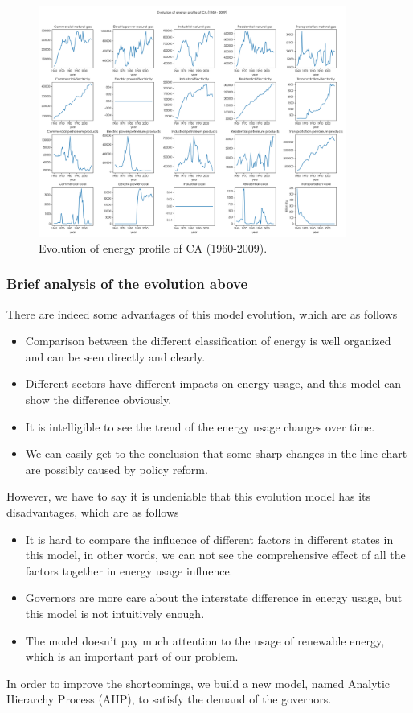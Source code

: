 \documentclass[a4paper,11pt]{article}
\begin{document}
\begin{figure}[H]%
    \centering 
    \includegraphics[width=0.9\textwidth]{./Pic/part-2-CA.png}
    \caption{Evolution of energy profile of CA (1960-2009).}
    \label{fig:part-2-CA}  
\end{figure}

\subsubsection{Brief analysis of the evolution above}
\par There are indeed some advantages of this model evolution, which are as follows
\begin{itemize}
    \item Comparison between the different classification of energy is well organized and can be seen directly and clearly.
    \item Different sectors have different impacts on energy usage, and this model can show the difference obviously.
    \item It is intelligible to see the trend of the energy usage changes over time.
    \item We can easily get to the conclusion that some sharp changes in the line chart are possibly caused by policy reform.  
\end{itemize}
\par However, we have to say it is undeniable that this evolution model has its disadvantages, which are as follows
\begin{itemize}
    \item It is hard to compare the influence of different factors in different states in this model, in other words, we can not see the comprehensive effect of all the factors together in energy usage influence.
    \item Governors are more care about the interstate difference in energy usage, but this model is not intuitively enough.
    \item The model doesn't pay much attention to the usage of renewable energy, which is an important part of our problem.
\end{itemize}
\par In order to improve the shortcomings, we build a new model, named Analytic Hierarchy Process (AHP), to satisfy the demand of the governors.
\end{document}
